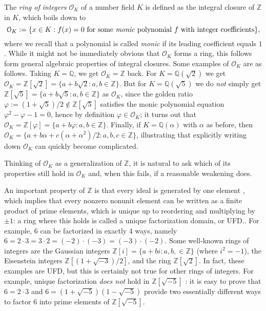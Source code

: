 \documentclass[a4paper,USenglish,cleveref, autoref, thm-restate]{lipics-v2021}
\newcommand*{\OK}[1][K]{\mathcal{O}_{#1}}
\newcommand{\Q}{\mathbb{Q}}
\newcommand{\Z}{\mathbb{Z}}
\begin{document}
The \emph{ring of integers} $\OK$ of a number field $K$ is defined as the integral closure of $\Z$ in $K$, which boils down to
\[
  \OK := \{x \in K : f(x)=0 \text{ for some \emph{monic} polynomial } f \text{ with integer coefficients}\},\]
where we recall that a polynomial is called \emph{monic} if its leading coefficient equals $1$.
While it might not be immediately obvious that $\OK$ forms a ring, this follows form general algebraic properties of integral closures.
Some examples of $\OK$ are as follows. Taking $K=\Q$, we get $\OK=\Z$ back. For $K=\Q(\sqrt{2})$ we get $\OK=\Z[\sqrt{2}]=\{a+b\sqrt{2} : a,b \in \Z\}$. But for $K=\Q(\sqrt{5})$ we do \emph{not} simply get $\Z[\sqrt{5}]=\{a+b\sqrt{5} : a,b \in \Z\}$ as $\OK$, since the golden ratio $\varphi:=(1+\sqrt{5})/2\not\in \Z[\sqrt{5}]$ satisfies the monic polynomial equation $\varphi^2-\varphi-1=0$, hence by definition $\varphi \in \OK$; it turns out that $\OK=\Z[\varphi]=\{a+b\varphi : a,b \in \Z\}$. %
Finally, if $K=\Q(\alpha)$ with $\alpha$ as before, then $\OK=\{a+b \alpha+c (\alpha+\alpha^2)/2 : a,b,c \in \Z\}$, illustrating that explicitly writing down $\OK$ can quickly become complicated.

Thinking of $\OK$ as a generalization of $\Z$, it is natural to ask which of its properties %
still hold in $\OK$ and, when this fails, if a reasonable weakening does. %

An important property of $\Z$ is that every ideal is generated by one element , which implies that every nonzero nonunit element can be written as a %
finite product of prime elements, which is unique up to reordering and multiplying by $\pm 1$: a ring where this holds is called a unique factorization domain, or UFD.. %
For example, $6$ can be factorized in exactly 4 ways, namely $6=2\cdot 3=3\cdot2=(-2)\cdot (-3)=(-3) \cdot (-2)$. Some well-known rings of integers are the Gaussian integers $\Z[i]=\{a+b i : a,b, \in \Z\}$ (where $i^2=-1$), the Eisenstein integers $\Z[(1+\sqrt{-3})/2]$, and the %
ring $\Z[\sqrt{2}]$. In fact, these examples are UFD, but this is certainly not true for other rings of integers. For example, unique factorization \emph{does not} hold in $\Z[\sqrt{-5}]$%
: it is easy to prove that $6=2\cdot3$ and $6=(1+\sqrt{-5}) (1-\sqrt{-5})$ provide two essentially different ways to factor $6$ into prime elements of $\Z[\sqrt{-5}]$.
\end{document}
